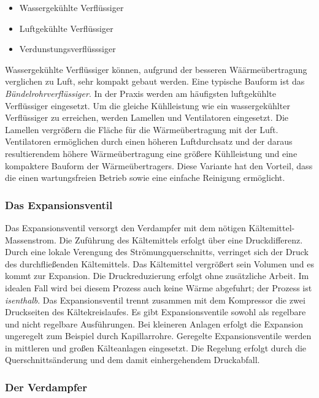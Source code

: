 \begin{itemize}
\item Wassergekühlte Verflüssiger
\item Luftgekühlte Verflüssiger
\item Verdunstungsverflüsssiger
\end{itemize}

Wassergekühlte Verflüssiger können, aufgrund der besseren Wäärmeübertragung verglichen zu Luft, sehr kompakt gebaut werden. Eine typische Bauform ist das \textit{Bündelrohrverflüssiger}.
In der Praxis werden am häufigsten luftgekühlte Verflüssiger eingesetzt. Um die gleiche Kühlleistung wie ein wassergekühlter Verflüssiger zu erreichen, werden Lamellen und Ventilatoren eingesetzt. Die Lamellen vergrößern die Fläche für die Wärmeübertragung mit der Luft. Ventilatoren ermöglichen durch einen höheren Luftdurchsatz und der daraus resultierendem höhere Wärmeübertragung eine größere Kühlleistung und eine kompaktere Bauform der Wärmeübertragers. Diese Variante hat den Vorteil, dass die einen wartungsfreien Betrieb  sowie eine einfache Reinigung ermöglicht.


\subsubsection*{Das Expansionsventil}

Das Expansionsventil versorgt den Verdampfer mit dem nötigen Kältemittel-Massenstrom. Die Zuführung des Kältemittels erfolgt über eine Druckdifferenz. Durch eine lokale Verengung des Strömungquerschnitts, verringet sich der Druck des durchfließenden Kältemittels. Das Kältemittel vergrößert sein Volumen und es kommt zur Expansion. Die Druckreduzierung erfolgt ohne zusätzliche Arbeit. Im idealen Fall wird bei diesem Prozess auch keine Wärme abgefuhrt; der Prozess ist \textit{isenthalb}. 
Das Expansionsventil trennt zusammen mit dem Kompressor die zwei Druckseiten des Kältekreislaufes. Es gibt Expansionsventile sowohl als regelbare und nicht regelbare Ausführungen. Bei kleineren Anlagen erfolgt die Expansion ungeregelt zum Beispiel durch Kapillarrohre. Geregelte Expansionsventile werden in mittleren und großen Kälteanlagen eingesetzt. Die Regelung erfolgt durch die Querschnittsänderung und dem damit einhergehendem Druckabfall.  

\subsubsection*{Der Verdampfer}

